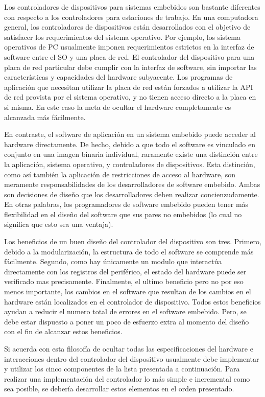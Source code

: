 \documentclass[12pt]{article}
\begin{document}
Los controladores de dispositivos para sistemas embebidos son bastante
diferentes con respecto a los controladores para estaciones de trabajo.
En una computadora general, los controladores de dispositivos están
desarrollados con el objetivo de satisfacer los requerimientos del sistema
operativo. Por ejemplo, los sistema operativos de PC usualmente imponen
requerimientos estrictos en la interfaz de software entre el SO y una
placa de red. El controlador del dispositivo para una placa de red particular
debe cumplir con la interfaz de software, sin importar las características
y capacidades del hardware subyacente. Los programas de aplicación que 
necesitan utilizar la placa de red están forzados a utilizar la API
de red provista por el sistema operativo, y no tienen acceso directo a la
placa en si misma. En este caso la meta de ocultar el hardware completamente
es alcanzada más fácilmente.

En contraste, el software de aplicación en un sistema embebido  puede acceder al
hardware directamente. De hecho, debido a que todo el software es
vinculado en conjunto en una imagen binaria individual, raramente existe
una
distinción entre la aplicación, sistema operativo, y controladores
de dispositivos.
Esta distinción, como así también la aplicación de restricciones de acceso 
al hardware,
son meramente responsabilidades de los desarrolladores de software embebido.
Ambas son decisiones de diseño que los desarrolladores deben realizar
concienzudamente. En otras palabras, los programadores de software 
embebido pueden tener más flexibilidad en el diseño del software
que sus pares no embebidos (lo cual no significa que esto sea
una ventaja).

Los beneficios de un buen diseño del controlador del dispositivo son tres.
Primero, debido a la modularización, la estructura de todo el software
se comprende más fácilmente. Segundo, como hay únicamente un modulo 
que interactúa directamente con los registros del periférico, el estado
del hardware puede ser verificado mas precisamente. Finalmente, el ultimo 
beneficio pero no por eso menos importante, los cambios en el software que
resultan de los cambios en el hardware están localizados en el controlador
de dispositivo. Todos estos beneficios ayudan a reducir el numero total
de errores en el software embebido.
Pero, se debe estar dispuesto a
poner un poco de esfuerzo extra al momento del diseño con el fin de 
alcanzar estos beneficios.

Si acuerda con esta filosofía de ocultar todas las especificaciones del hardware
e interacciones dentro del controlador del dispositivo usualmente debe 
implementar y utilizar los cinco componentes de la lista presentada a continuación.
Para realizar una implementación del controlador lo más simple e incremental
como sea posible, se debería desarrollar estos elementos en el orden
presentado.
\end{document}
